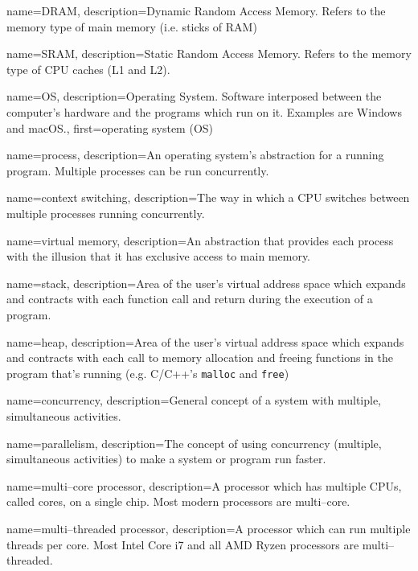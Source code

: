  {
    name=DRAM,
    description={Dynamic Random Access Memory. Refers to the memory type of main memory (i.e. sticks of RAM)}
}

 {
    name=SRAM,
    description={Static Random Access Memory. Refers to the memory type of CPU caches (L1 and L2).}
}

 {
    name=OS,
    description={Operating System. Software interposed between the computer's hardware and the programs which run on it. Examples are Windows and macOS.},
    first={operating system (OS)}
}

 {
    name=process,
    description={An operating system's abstraction for a running program. Multiple processes can be run concurrently.}
}

 {
    name=context switching,
    description={The way in which a CPU switches between multiple processes running concurrently.}
}

 {
    name=virtual memory,
    description={An abstraction that provides each process with the illusion that it has exclusive access to main memory.}
}

 {
    name=stack,
    description={Area of the user's virtual address space which expands and contracts with each function call and return during the execution of a program.}
}

 {
    name=heap,
    description={Area of the user's virtual address space which expands and contracts with each call to memory allocation and freeing functions in the program that's running (e.g. C/C++'s \texttt{malloc} and \texttt{free})}
}

 {
    name=concurrency,
    description={General concept of a system with multiple, simultaneous activities.}
}

 {
    name=parallelism,
    description={The concept of using concurrency (multiple, simultaneous activities) to make a system or program run faster.}
}

 {
    name=multi--core processor,
    description={A processor which has multiple CPUs, called cores, on a single chip. Most modern processors are multi--core.}
}

 {
    name=multi--threaded processor,
    description={A processor which can run multiple threads per core. Most Intel Core i7 and all AMD Ryzen processors are multi--threaded.}
}

